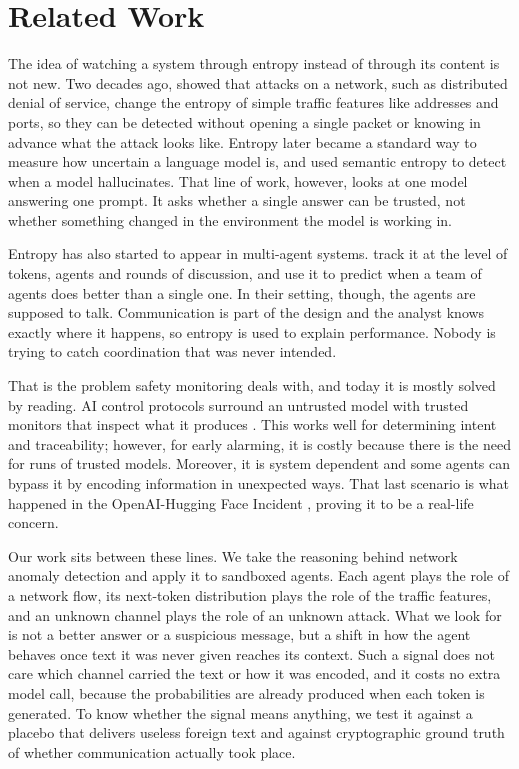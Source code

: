 \section{Related Work}
\label{sec:related}

The idea of watching a system through entropy instead of through its content is not new. Two decades ago, \textcite{shannon_ddos} showed that attacks on a network, such as distributed denial of service, change the entropy of simple traffic features like addresses and ports, so they can be detected without opening a single packet or knowing in advance what the attack looks like. Entropy later became a standard way to measure how uncertain a language model is, and \textcite{shannon_hallucination} used semantic entropy to detect when a model hallucinates. That line of work, however, looks at one model answering one prompt. It asks whether a single answer can be trusted, not whether something changed in the environment the model is working in.

Entropy has also started to appear in multi-agent systems. \textcite{zhao2026doesmultiagentcollaborationhelp} track it at the level of tokens, agents and rounds of discussion, and use it to predict when a team of agents does better than a single one. In their setting, though, the agents are supposed to talk. Communication is part of the design and the analyst knows exactly where it happens, so entropy is used to explain performance. Nobody is trying to catch coordination that was never intended.

That is the problem safety monitoring deals with, and today it is mostly solved by reading. AI control protocols surround an untrusted model with trusted monitors that inspect what it produces \parencite{greenblatt2024control}. This works well for determining intent and traceability; however, for early alarming, it is costly because there is the need for runs of trusted models. Moreover, it is system dependent and some agents can bypass it by encoding information in unexpected ways. That last scenario is what happened in the OpenAI-Hugging Face Incident \parencite{openai2026incident}, proving it to be a real-life concern.

Our work sits between these lines. We take the reasoning behind network anomaly detection and apply it to sandboxed agents. Each agent plays the role of a network flow, its next-token distribution plays the role of the traffic features, and an unknown channel plays the role of an unknown attack. What we look for is not a better answer or a suspicious message, but a shift in how the agent behaves once text it was never given reaches its context. Such a signal does not care which channel carried the text or how it was encoded, and it costs no extra model call, because the probabilities are already produced when each token is generated. To know whether the signal means anything, we test it against a placebo that delivers useless foreign text and against cryptographic ground truth of whether communication actually took place.
